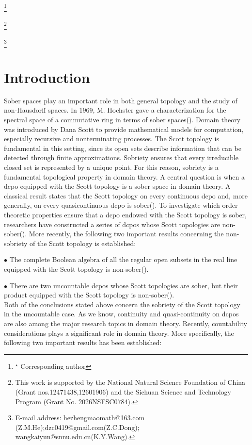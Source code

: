 \documentclass[preprint,12pt]{elsarticle}
\numberwithin{equation}{section}
\newcommand\blfootnote[1]{%
\begingroup
\renewcommand\thefootnote{}\footnote{#1}%
\addtocounter{footnote}{-1}%
\endgroup
}
\begin{document}
\blfootnote{$^\star$ Corresponding author}
\blfootnote{This work is supported by the National Natural Science Foundation of China (Grant nos.12471438,12601906) and the Sichuan Science and Technology Program (Grant No. 2026NSFSC0784).}
\blfootnote{E-mail address: hezhengmaomath@163.com (Z.M.He);dzc0419@gmail.com(Z.C.Dong);\\ wangkaiyun@snnu.edu.cn(K.Y.Wang).}


\section{Introduction}
\label{}

Sober spaces play an important role in both general topology and the study of non-Hausdorff spaces. In 1969, M. Hochster gave a characterization for the spectral space of a commutative ring in terms of sober spaces(\cite{U11}). Domain theory was introduced by Dana Scott to provide mathematical models for computation, especially recursive and nonterminating processes. The Scott topology is fundamental in this setting, since its open sets describe information that can be detected through finite approximations. Sobriety ensures that every irreducible closed set is represented by a unique point. For this reason, sobriety is a fundamental topological property in domain theory. A central question is when a dcpo equipped with the Scott topology is a sober space in domain theory. A classical result states that the Scott topology on every continuous dcpo and, more generally, on every quasicontinuous dcpo is sober(\cite{GG03}). To investigate which order-theoretic properties ensure that a dcpo endowed with the Scott topology is sober, researchers have constructed a series of dcpos whose Scott topologies are non-sober(\cite{U13,U14,ME182,AB75,EEE20}). More recently, the following two important results concerning the non-sobriety of the Scott topology is established:

$\bullet$ The complete Boolean algebra of all the regular open subsets in the real line equipped with the Scott topology is non-sober(\cite{EEF32}).

$\bullet$ There are two uncountable dcpos whose Scott topologies are sober, but their product equipped with the Scott topology is non-sober(\cite{EEF31}).\\
Both of the conclusions stated above concern the sobriety of the Scott topology in the uncountable case. As we know, continuity and quasi-continuity on dcpos are also among the major research topics in domain theory. Recently, countability considerations plays a significant role in domain theory. More specifically, the following two important results has been established:
\end{document}
